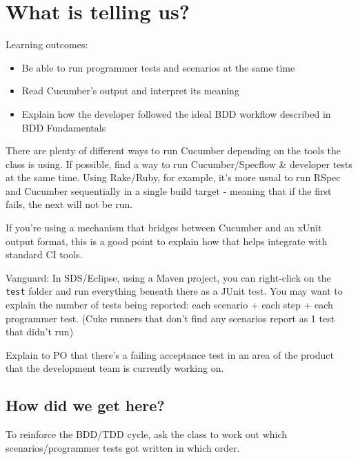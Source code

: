 \chapter*{What is \CUKE{} telling us?}

\ifnotes

    Learning outcomes:
    
    \begin{itemize}
        \item Be able to run programmer tests and scenarios at the same time
        \item Read Cucumber's output and interpret its meaning
        \item Explain how the developer followed the ideal BDD workflow described in BDD Fundamentals
    \end{itemize}

    There are plenty of different ways to run Cucumber depending on the tools the class is using. If possible, find a way to run Cucumber/Specflow \& developer tests at the same time. Using Rake/Ruby, for example, it's more usual to run RSpec and Cucumber sequentially in a single build target - meaning that if the first fails, the next will not be run.
    
    If you're using a mechanism that bridges between Cucumber and an xUnit output format, this is a good point to explain how that helps integrate with standard CI tools.
    
    Vanguard: In SDS/Eclipse, using a Maven project, you can right-click on the \texttt{test} folder and run everything beneath there as a JUnit test.
    You may want to explain the number of tests being reported: each scenario + each step + each programmer test. (Cuke runners that don't find any scenarios report as 1 test that didn't run)
    
    Explain to PO that there's a failing acceptance test in an area of the product that the development team is currently working on.

    \section*{How did we get here?}
    
    To reinforce the BDD/TDD cycle, ask the class to work out which scenarios/programmer tests got written in which order.
    
